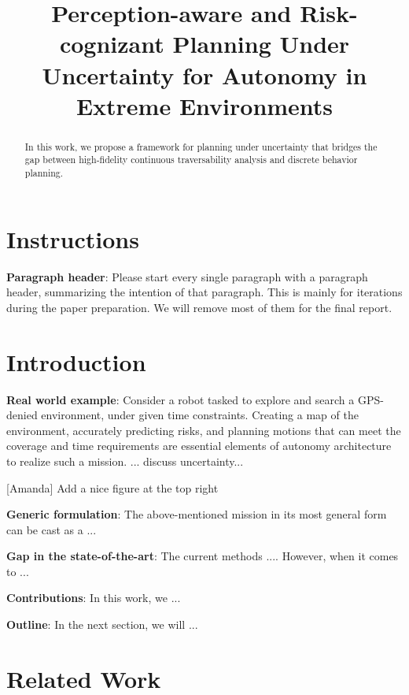 \documentclass[letterpaper, 10 pt, conference]{ieeeconf}  %
\title{\LARGE \bf
Perception-aware and Risk-cognizant Planning Under Uncertainty for Autonomy in Extreme Environments
}
\newcommand{\ph}[1]{{\textbf{#1}:}} %
\newcommand{\todo}[1]{{\color{red} #1 }} %
\begin{document}
\maketitle
\thispagestyle{empty}
\pagestyle{empty}


\begin{abstract}
In this work, we propose a framework for planning under uncertainty that bridges the gap between high-fidelity continuous traversability analysis and discrete behavior planning.
\end{abstract}


\section{Instructions}
\ph{Paragraph header} Please start every single paragraph with a paragraph header, summarizing the intention of that paragraph. This is mainly for iterations during the paper preparation. We will remove most of them for the final report.

\section{Introduction}
\ph{Real world example} Consider a robot tasked to explore and search a GPS-denied environment, under given time constraints. Creating a map of the environment, accurately predicting risks, and planning motions that can meet the coverage and time requirements are essential elements of autonomy architecture to realize such a mission.
... discuss uncertainty...

\todo{[Amanda] Add a nice figure at the top right}

\ph{Generic formulation}
The above-mentioned mission in its most general form can be cast as a ...

\ph{Gap in the state-of-the-art}
The current methods .... However, when it comes to ... 

\ph{Contributions}
In this work, we ...

\ph{Outline}
In the next section, we will ...


\section{Related Work}
\end{document}
